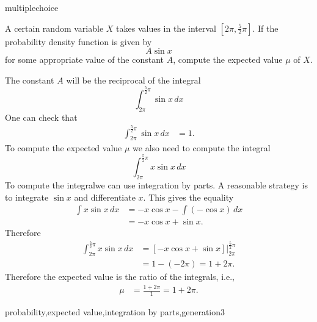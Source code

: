 \documentclass{ximera}
\begin{document}
\begin{question}[ProbEVsinibp001]
\begin{type}
multiplechoice
\end{type}
A certain random variable \(X\) takes values in the interval \(\left[2 \pi , \frac{5}{2} \pi \right]\).
If the probability density function is given by
\[ A \sin {x} \]
 for some appropriate value of the constant \(A\),
compute the expected value \(\mu\) of \(X\).
\begin{multiplechoice}
\choice{\(\displaystyle \mu = 2 \pi\)}
\end{multiplechoice}
\begin{feedback}
The constant \(A\) will be the reciprocal of the integral
\[ \int_{2 \pi}^{\frac{5}{2} \pi} \sin {x}\, dx \]
 One can check that
\[ \begin{aligned} \int_{2 \pi}^{\frac{5}{2} \pi} \sin {x}\, dx & = 1. \end{aligned} \]
To compute the expected value \(\mu\) we also need to compute the integral 
\[ \int_{2 \pi}^{\frac{5}{2} \pi} x \sin {x}\, dx \]
 To compute the integralwe can use integration by parts. A reasonable strategy is to integrate  \(\sin {x}\) and differentiate  \(x\).
 This gives the equality
\[ \begin{aligned} \int x \sin {x}\, dx & = - x \cos {x} - \int \left(- \cos {x}\right)\, dx \\
 & = - x \cos {x} + \sin {x}. \end{aligned} \]
Therefore 
\[ \begin{aligned} \int_{2 \pi}^{\frac{5}{2} \pi} x \sin {x}\, dx & = \left. \left[- x \cos {x} + \sin {x} \right] \right|_{2 \pi}^{\frac{5}{2} \pi}\\ & = 1 - \left(- 2 \pi \right) = 1 + 2 \pi. \end{aligned} \]
Therefore the expected value is the ratio of the integrals, i.e.,
\[ \begin{aligned} \mu & = \frac{1 + 2 \pi}{1} = 1 + 2 \pi. \end{aligned} \]
\end{feedback}
\begin{keywords}
probability,expected value,integration by parts,generation3
\end{keywords}
\end{question}
\end{document}
